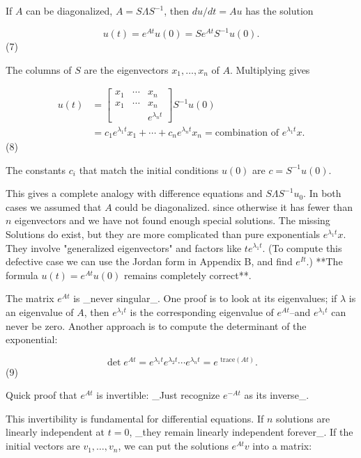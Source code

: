 If \(A\) can be diagonalized, \(A=S\Lambda S^{-1}\), then \(du/dt=Au\) has the solution

\[u(t)=e^{At}u(0)=Se^{At}S^{-1}u(0).\] (7)

The columns of \(S\) are the eigenvectors \(x_{1},\ldots,x_{n}\) of \(A\). Multiplying gives

\[\begin{split} u(t)&=\begin{bmatrix}x_{1}&\cdots&x_{n} \\ x_{1}&\cdots&x_{n}\\ &&e^{\lambda_{n}t}\end{bmatrix}S^{-1}u(0)\\ &=c_{1}e^{\lambda_{1}t}x_{1}+\cdots+c_{n}e^{\lambda_{n}t}x_{n}= \text{combination of }e^{\lambda_{1}t}x.\end{split}\] (8)

The constants \(c_{i}\) that match the initial conditions \(u(0)\) are \(c=S^{-1}u(0)\).

This gives a complete analogy with difference equations and \(S\Lambda S^{-1}u_{0}\). In both cases we assumed that \(A\) could be diagonalized. since otherwise it has fewer than \(n\) eigenvectors and we have not found enough special solutions. The missing Solutions do exist, but they are more complicated than pure exponentials \(e^{\lambda_{1}t}x\). They involve "generalized eigenvectors" and factors like \(te^{\lambda_{1}t}\). (To compute this defective case we can use the Jordan form in Appendix B, and find \(e^{It}\).) **The formula \(u(t)=e^{At}u(0)\) remains completely correct**.

The matrix \(e^{At}\) is _never singular_. One proof is to look at its eigenvalues; if \(\lambda\) is an eigenvalue of \(A\), then \(e^{\lambda_{1}t}\) is the corresponding eigenvalue of \(e^{At}\)--and \(e^{\lambda_{1}t}\) can never be zero. Another approach is to compute the determinant of the exponential:

\[\det e^{At}=e^{\lambda_{1}t}e^{\lambda_{2}t}\cdots e^{\lambda_{n}t}=e^{\text{ trace}(At)}.\] (9)

Quick proof that \(e^{At}\) is invertible: _Just recognize \(e^{-At}\) as its inverse_.

This invertibility is fundamental for differential equations. If \(n\) solutions are linearly independent at \(t=0\), _they remain linearly independent forever_. If the initial vectors are \(v_{1},\ldots,v_{n}\), we can put the solutions \(e^{At}v\) into a matrix:

